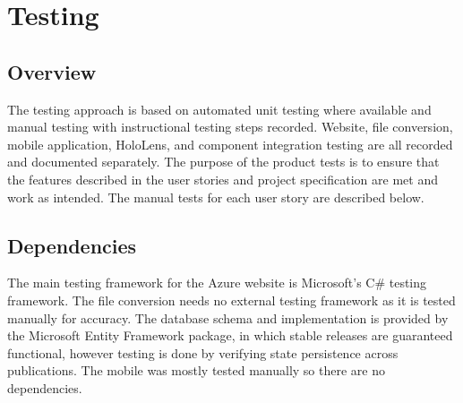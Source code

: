 

\chapter{Testing}
\label{ch:testing}


\section{Overview}
\tab The testing approach is based on automated unit testing where available and manual testing with instructional testing steps recorded. Website, file conversion, mobile application, HoloLens, and component integration testing are all recorded and documented separately. The purpose of the product tests is to ensure that the features described in the user stories and project specification are met and work as intended. The manual tests for each user story are described below.

\section{Dependencies}
\tab The main testing framework for the Azure website is Microsoft's C\# testing framework. The file conversion needs no external testing framework as it is tested manually for accuracy. The database schema and implementation is provided by the Microsoft Entity Framework package, in which stable releases are guaranteed functional, however testing is done by verifying state persistence across publications. The mobile was mostly tested manually so there are no dependencies.















